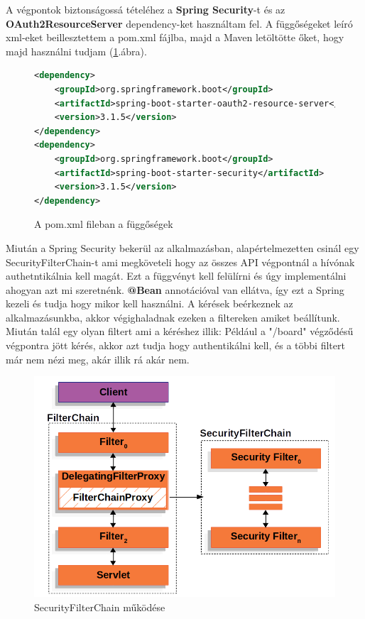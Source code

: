 \documentclass[a4paper,twoside]{article}
\begin{document}
A végpontok biztonságossá tételéhez a \textbf{Spring Security}-t és az \textbf{OAuth2ResourceServer} dependency-ket használtam fel. A függőségeket leíró xml-eket beillesztettem a pom.xml fájlba, majd a Maven letöltötte őket, hogy majd használni tudjam (\ref{pom}.ábra).
\begin{figure}
	\caption{A pom.xml fileban a függőségek}
	\centering
	\begin{lstlisting}[language=XML]
<dependency>
	<groupId>org.springframework.boot</groupId>
	<artifactId>spring-boot-starter-oauth2-resource-server</artifactId>
	<version>3.1.5</version>
</dependency>
<dependency>
	<groupId>org.springframework.boot</groupId>
	<artifactId>spring-boot-starter-security</artifactId>
	<version>3.1.5</version>
</dependency>
	\end{lstlisting}
	\label{pom}
\end{figure}


Miután a Spring Security bekerül az alkalmazásban, alapértelmezetten csinál egy SecurityFilterChain-t ami megköveteli hogy az összes API végpontnál
a hívónak authetntikálnia kell magát. Ezt a függvényt kell felülírni és úgy implementálni ahogyan azt mi szeretnénk. \textbf{@Bean} annotációval van ellátva,
így ezt a Spring kezeli és tudja hogy mikor kell használni. A kérések beérkeznek az alkalmazásunkba, akkor végighaladnak ezeken a filtereken amiket beállítunk. Miután talál 
egy olyan filtert ami a kéréshez illik: Például a "/board" végződésű végpontra jött kérés, akkor azt tudja hogy authentikálni kell, és a többi filtert már nem nézi meg, akár illik rá akár nem. 

\begin{figure}[h]
	\caption{SecurityFilterChain működése }
	\centering
	\includegraphics[scale=0.5]{filterchain}
\end{figure}
\end{document}
